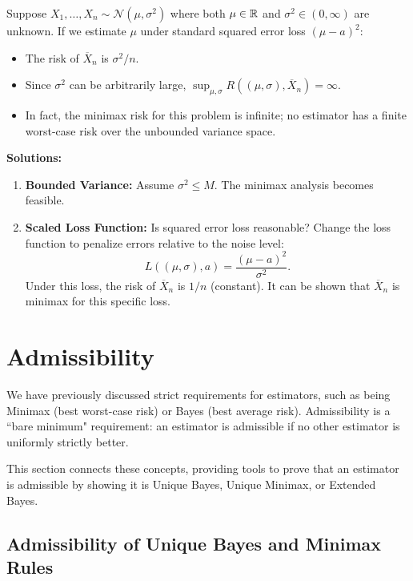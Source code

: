\begin{ex}
    
Suppose \(X_1, \dots, X_n \sim \mathcal{N}(\mu, \sigma^2)\) where both \(\mu \in \mathbb{R}\) and \(\sigma^2 \in (0, \infty)\) are unknown.
If we estimate \(\mu\) under standard squared error loss \((\mu - a)^2\):

\begin{itemize}
    \item The risk of \(\overline{X}_n\) is \(\sigma^2/n\).
    \item Since \(\sigma^2\) can be arbitrarily large, \(\sup_{\mu, \sigma} R((\mu, \sigma), \overline{X}_n) = \infty\).
    \item In fact, the minimax risk for this problem is infinite; no estimator has a finite worst-case risk over the unbounded variance space.
\end{itemize}

\textbf{Solutions:}
\begin{enumerate}[label=(\roman*)]
    \item \textbf{Bounded Variance:} Assume \(\sigma^2 \le M\). The minimax analysis becomes feasible.
    \item \textbf{Scaled Loss Function:} Is squared error loss reasonable? Change the loss function to penalize errors relative to the noise level:
    \[ L((\mu, \sigma), a) = \frac{(\mu - a)^2}{\sigma^2}. \]
    Under this loss, the risk of \(\overline{X}_n\) is \(1/n\) (constant). It can be shown that \(\overline{X}_n\) is minimax for this specific loss.
\end{enumerate}
\end{ex}

\section{Admissibility}
\label{sec:admissibility}

We have previously discussed strict requirements for estimators, such as being Minimax (best worst-case risk) or Bayes (best average risk). Admissibility is a ``bare minimum" requirement: an estimator is admissible if no other estimator is uniformly strictly better.

This section connects these concepts, providing tools to prove that an estimator is admissible by showing it is Unique Bayes, Unique Minimax, or Extended Bayes.

\subsection{Admissibility of Unique Bayes and Minimax Rules}
\label{subsec:unique_bayes_minimax}

